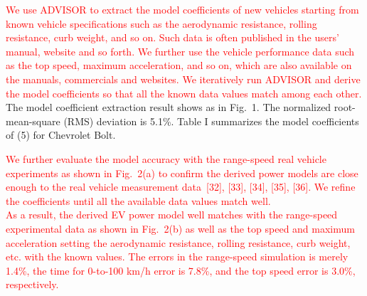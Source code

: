 \documentclass[onecolumn]{IEEEconf}
\begin{document}
\begin{description}
\textcolor{red}{We use ADVISOR to extract the model coefficients of new vehicles starting from known vehicle specifications such as the aerodynamic resistance, rolling resistance, curb weight, and so on. Such data is often published in the users' manual, website and so forth. We further use the vehicle performance data such as the top speed, maximum acceleration, and so on, which are also available on the manuals, commercials and websites. We iteratively run ADVISOR and derive the model coefficients so that all the known data values match among each other.}
The model coefficient extraction result shows as in Fig.~1. The normalized root-mean-square (RMS) deviation is 5.1\%. Table I summarizes the model coefficients of (5) for Chevrolet Bolt.

\textcolor{red}{We further evaluate the model accuracy with the range-speed real vehicle experiments as shown in Fig.~2(a) to confirm the derived power models are close enough to the real vehicle measurement data~[32], [33], [34], [35], [36]. We  refine the coefficients until all the available data values match well. \\
As a result, the derived EV power model well matches with the range-speed experimental data as shown in Fig.~2(b) as well as the top speed and maximum acceleration setting the aerodynamic resistance, rolling resistance, curb weight, etc. with the known values. The errors in the range-speed simulation is merely 1.4\%, the time for 0-to-100 km/h error is 7.8\%, and the top speed error is 3.0\%, respectively.} 



\end{description}
\end{document}
